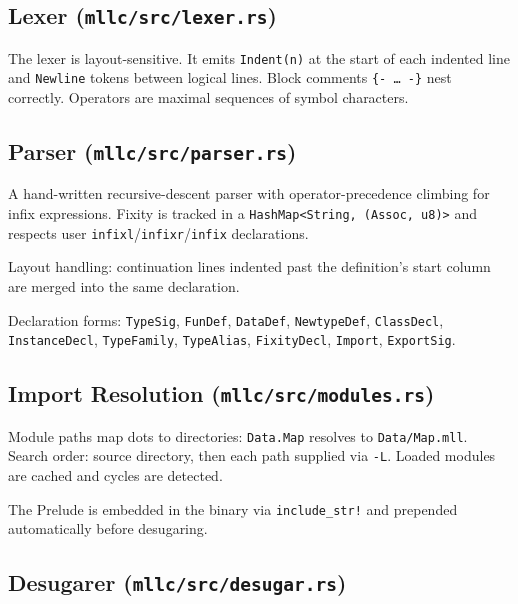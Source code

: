 \documentclass[11pt,a4paper]{article}
\begin{document}
\subsection{Lexer (\texttt{mllc/src/lexer.rs})}

The lexer is layout-sensitive.  It emits \texttt{Indent(n)} at the start of each
indented line and \texttt{Newline} tokens between logical lines.  Block comments
\texttt{\{- \ldots\ -\}} nest correctly.  Operators are maximal sequences of
symbol characters.

\subsection{Parser (\texttt{mllc/src/parser.rs})}

A hand-written recursive-descent parser with operator-precedence climbing for
infix expressions.  Fixity is tracked in a \texttt{HashMap<String, (Assoc, u8)>}
and respects user \texttt{infixl}/\texttt{infixr}/\texttt{infix} declarations.

Layout handling: continuation lines indented past the definition's start column
are merged into the same declaration.

Declaration forms: \texttt{TypeSig}, \texttt{FunDef}, \texttt{DataDef},
\texttt{NewtypeDef}, \texttt{ClassDecl}, \texttt{InstanceDecl},
\texttt{TypeFamily}, \texttt{TypeAlias}, \texttt{FixityDecl}, \texttt{Import},
\texttt{ExportSig}.

\subsection{Import Resolution (\texttt{mllc/src/modules.rs})}

Module paths map dots to directories: \texttt{Data.Map} resolves to
\texttt{Data/Map.mll}.  Search order: source directory, then each path supplied
via \texttt{-L}.  Loaded modules are cached and cycles are detected.

The Prelude is embedded in the binary via \texttt{include\_str!} and
prepended automatically before desugaring.

\subsection{Desugarer (\texttt{mllc/src/desugar.rs})}
\end{document}
